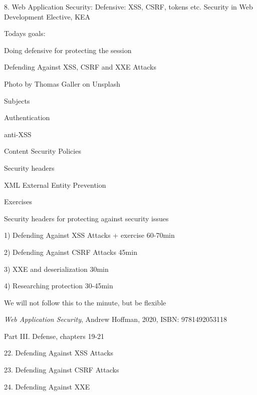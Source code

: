\documentclass[Screen16to9,17pt]{foils}
\begin{document}
\mytitlepage
{8. Web Application Security: Defensive: XSS, CSRF, tokens etc.}
{Security in Web Development Elective, KEA}




Todays goals:
\begin{list2}
\item Doing defensive for protecting the session
\item Defending Against XSS, CSRF and XXE Attacks
\end{list2}

Photo by Thomas Galler on Unsplash




\begin{list1}
\item Subjects
\begin{list2}
\item Authentication
\item anti-XSS
\item Content Security Policies
\item Security headers
\item XML External Entity Prevention
\end{list2}
\item Exercises
\begin{list2}
\item Security headers for protecting against security issues
\end{list2}
\end{list1}


\begin{list2}
\item 1) Defending Against XSS Attacks + exercise 60-70min
\item 2) Defending Against CSRF Attacks 45min
\item 3) XXE and deserialization 30min
\item 4) Researching protection 30-45min
\end{list2}

We will not follow this to the minute, but be flexible


\emph{Web Application Security}, Andrew Hoffman, 2020, ISBN: 9781492053118

\begin{list1}
\item Part III. Defense, chapters 19-21
\item 22. Defending Against XSS Attacks
\item 23. Defending Against CSRF Attacks
\item 24. Defending Against XXE
\end{list1}
\end{document}
